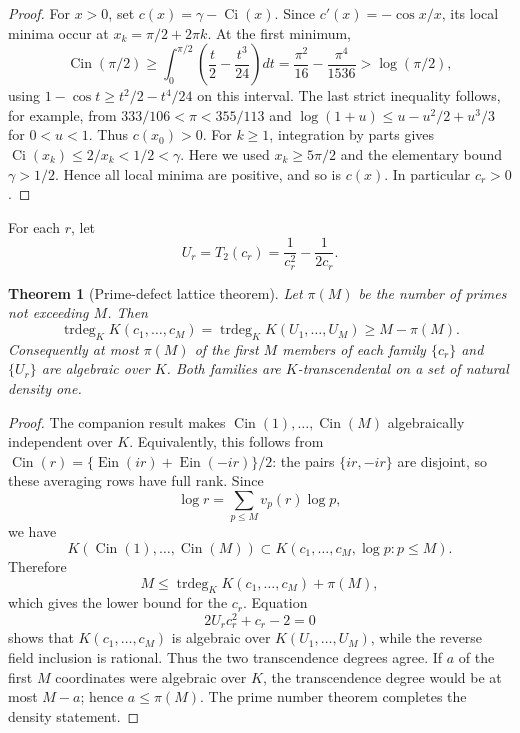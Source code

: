\documentclass[11pt]{article}
\theoremstyle{keio}
\newtheorem{theorem}{Theorem}[section]
\theoremstyle{definition}
\theoremstyle{remark}
\newcommand{\Ein}{\operatorname{Ein}}
\newcommand{\Cin}{\operatorname{Cin}}
\newcommand{\Ci}{\operatorname{Ci}}
\newcommand{\trdeg}{\operatorname{trdeg}}
\begin{document}
\begin{proof}
For \(x>0\), set \(c(x)=\gamma-\Ci(x)\).  Since
\(c'(x)=-\cos x/x\), its local minima occur at
\(x_k=\pi/2+2\pi k\).  At the first minimum,
\[
 \Cin(\pi/2)
 \ge \int_0^{\pi/2}\left(\frac t2-\frac{t^3}{24}\right)dt
 =\frac{\pi^2}{16}-\frac{\pi^4}{1536}
 >\log(\pi/2),
\]
using \(1-\cos t\ge t^2/2-t^4/24\) on this interval.  The last strict
inequality follows, for example, from
\(333/106<\pi<355/113\) and
\(\log(1+u)\le u-u^2/2+u^3/3\) for \(0<u<1\).
Thus
\(c(x_0)>0\).  For \(k\ge1\), integration by parts gives
\(\Ci(x_k)\le2/x_k<1/2<\gamma\).  Here we used
\(x_k\ge5\pi/2\) and the elementary bound \(\gamma>1/2\).
Hence all local minima are positive, and so is
\(c(x)\).  In particular \(c_r>0\).
\end{proof}

For each \(r\), let
\begin{equation}\label{eq:Ur}
 U_r=T_2(c_r)=\frac1{c_r^2}-\frac1{2c_r}.
\end{equation}

\begin{theorem}[Prime-defect lattice theorem]
\label{thm:prime-defect}
Let \(\pi(M)\) be the number of primes not exceeding \(M\).  Then
\begin{equation}\label{eq:prime-defect-trdeg}
 \trdeg_KK(c_1,\ldots,c_M)
 =\trdeg_KK(U_1,\ldots,U_M)
 \ge M-\pi(M).
\end{equation}
Consequently at most \(\pi(M)\) of the first \(M\) members of each family
\(\{c_r\}\) and \(\{U_r\}\) are algebraic over \(K\).  Both families are
\(K\)-transcendental on a set of natural density one.
\end{theorem}

\begin{proof}
The companion result \cite[Cor.~5.5]{KEIO2026I} makes
\(\Cin(1),\ldots,\Cin(M)\) algebraically independent over \(K\).
Equivalently, this follows from
\(\Cin(r)=\{\Ein(ir)+\Ein(-ir)\}/2\): the pairs
\(\{ir,-ir\}\) are disjoint, so these averaging rows have full rank.
Since
\[
 \log r=\sum_{p\le M}v_p(r)\log p,
\]
we have
\[
 K(\Cin(1),\ldots,\Cin(M))
 \subset K(c_1,\ldots,c_M,\log p:p\le M).
\]
Therefore
\[
 M\le \trdeg_KK(c_1,\ldots,c_M)+\pi(M),
\]
which gives the lower bound for the \(c_r\).  Equation
\[
 2U_rc_r^2+c_r-2=0
\]
shows that \(K(c_1,\ldots,c_M)\) is algebraic over
\(K(U_1,\ldots,U_M)\), while the reverse field inclusion is rational.
Thus the two transcendence degrees agree.  If \(a\) of the first \(M\)
coordinates were algebraic over \(K\), the transcendence degree would be at
most \(M-a\); hence \(a\le\pi(M)\).  The prime number theorem completes the
density statement.
\end{proof}
\end{document}
